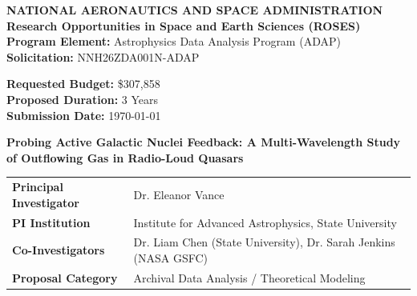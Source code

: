 \documentclass[11pt]{article}
\begin{document}
\noindent
\begin{minipage}[t]{0.65\textwidth}
  {\footnotesize\textbf{NATIONAL AERONAUTICS AND SPACE ADMINISTRATION}} \\
  {\large\bfseries\color{nasablue} Research Opportunities in Space and Earth Sciences (ROSES)} \\
  {\small\bfseries Program Element:} Astrophysics Data Analysis Program (ADAP) \\
  {\small\bfseries Solicitation:} NNH26ZDA001N-ADAP
\end{minipage}
\hfill
\begin{minipage}[t]{0.3\textwidth}
  \raggedleft
  {\small\bfseries Requested Budget:} \$307,858 \\
  {\small\bfseries Proposed Duration:} 3 Years \\
  {\small\bfseries Submission Date:} \today
\end{minipage}

\vspace{1.5em}
\noindent
\begin{center}
  {\LARGE\bfseries\color{nasablue} Probing Active Galactic Nuclei Feedback: A Multi-Wavelength Study of Outflowing Gas in Radio-Loud Quasars}
\end{center}
\vspace{1em}

\noindent
{}
\begin{tabular}{@{}p{3.5cm}l}
  \toprule
  \textbf{Principal Investigator} & Dr. Eleanor Vance \\
  \textbf{PI Institution}        & Institute for Advanced Astrophysics, State University \\
  \textbf{Co-Investigators}      & Dr. Liam Chen (State University), Dr. Sarah Jenkins (NASA GSFC) \\
  \textbf{Proposal Category}     & Archival Data Analysis / Theoretical Modeling \\
  \bottomrule
\end{tabular}
\vspace{2em}






\end{document}
